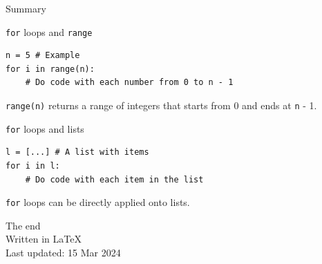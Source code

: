 \documentclass[dvipsnames, svgnames, x11names, handout]{beamer}
\begin{document}
\begin{frame}[fragile]{Summary}
\begin{block}{\texttt{for} loops and \texttt{range}}
\begin{verbatim}
n = 5 # Example
for i in range(n):
    # Do code with each number from 0 to n - 1
\end{verbatim}
\texttt{range(n)} returns a range of integers that starts from 0 and ends at \texttt{n} - 1.
\end{block}

\begin{block}{\texttt{for} loops and lists}
\begin{verbatim}
l = [...] # A list with items
for i in l:
    # Do code with each item in the list
\end{verbatim}
\texttt{for} loops can be directly applied onto lists.
\end{block}
\end{frame}

\begin{frame}{\text{}}
	\begin{center}
		The end\\
		Written in \LaTeX\\
		Last updated: 15 Mar 2024
	\end{center}
\end{frame}
\end{document}
